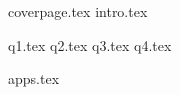 \documentclass[12pt]{extarticle}
\begin{document}
    {coverpage.tex}
    {intro.tex}

    {q1.tex}
    {q2.tex}
    {q3.tex}
    {q4.tex}
    

    {apps.tex}
\end{document}
